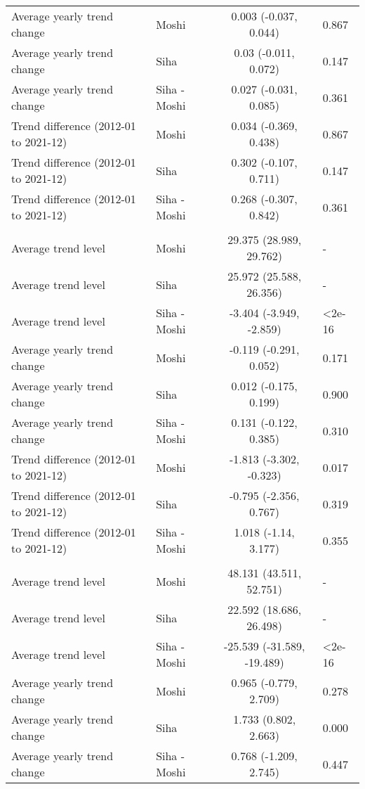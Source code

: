 \begin{longtable}{l|lcl}
Average yearly trend change & Moshi & 0.003 (-0.037, 0.044) & 0.867 \\ 
Average yearly trend change & Siha & 0.03 (-0.011, 0.072) & 0.147 \\ 
Average yearly trend change & Siha - Moshi & 0.027 (-0.031, 0.085) & 0.361 \\ 
Trend difference (2012-01 to 2021-12) & Moshi & 0.034 (-0.369, 0.438) & 0.867 \\ 
Trend difference (2012-01 to 2021-12) & Siha & 0.302 (-0.107, 0.711) & 0.147 \\ 
Trend difference (2012-01 to 2021-12) & Siha - Moshi & 0.268 (-0.307, 0.842) & 0.361 \\ 
\midrule\addlinespace[2.5pt]
\multicolumn{4}{l}{UTCI } \\ 
\midrule\addlinespace[2.5pt]
Average trend level & Moshi & 29.375 (28.989, 29.762) & - \\ 
Average trend level & Siha & 25.972 (25.588, 26.356) & - \\ 
Average trend level & Siha - Moshi & -3.404 (-3.949, -2.859) & <2e-16 \\ 
Average yearly trend change & Moshi & -0.119 (-0.291, 0.052) & 0.171 \\ 
Average yearly trend change & Siha & 0.012 (-0.175, 0.199) & 0.900 \\ 
Average yearly trend change & Siha - Moshi & 0.131 (-0.122, 0.385) & 0.310 \\ 
Trend difference (2012-01 to 2021-12) & Moshi & -1.813 (-3.302, -0.323) & 0.017 \\ 
Trend difference (2012-01 to 2021-12) & Siha & -0.795 (-2.356, 0.767) & 0.319 \\ 
Trend difference (2012-01 to 2021-12) & Siha - Moshi & 1.018 (-1.14, 3.177) & 0.355 \\ 
\midrule\addlinespace[2.5pt]
\multicolumn{4}{l}{Rainfall (mm)} \\ 
\midrule\addlinespace[2.5pt]
Average trend level & Moshi & 48.131 (43.511, 52.751) & - \\ 
Average trend level & Siha & 22.592 (18.686, 26.498) & - \\ 
Average trend level & Siha - Moshi & -25.539 (-31.589, -19.489) & <2e-16 \\ 
Average yearly trend change & Moshi & 0.965 (-0.779, 2.709) & 0.278 \\ 
Average yearly trend change & Siha & 1.733 (0.802, 2.663) & 0.000 \\ 
Average yearly trend change & Siha - Moshi & 0.768 (-1.209, 2.745) & 0.447 \\ 

\end{longtable}
